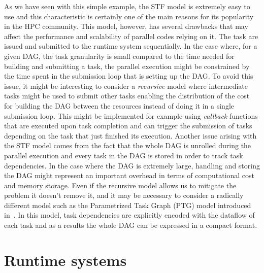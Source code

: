 \documentclass{article}
\begin{document}
As we have seen with this simple example, the STF model is extremely
easy to use and this characteristic is certainly one of the main
reasons for its popularity in the HPC community. This model, however,
has several drawbacks that may affect the performance and scalability
of parallel codes relying on it. The task are issued and submitted to
the runtime system sequentially. In the case where, for a given DAG,
the task granularity is small compared to the time needed for building
and submitting a task, the parallel execution might be constrained
by the time spent in the submission loop that is setting up the
DAG. To avoid this issue, it might be interesting to consider a
\textit{recursive} model where intermediate tasks might be used to
submit other tasks enabling the distribution of the cost for building
the DAG between the resources instead of doing it in a single
submission loop. This might be implemented for example using
\textit{callback} functions that are executed upon task completion and
can trigger the submission of tasks depending on the task that just
finished its execution. Another issue arising with the STF model comes
from the fact that the whole DAG is unrolled during the parallel
execution and every task in the DAG is stored in order to track task
dependencies. In the case where the DAG is extremely large, handling
and storing the DAG might represent an important overhead in terms of
computational cost and memory storage. Even if the recursive model
allows us to mitigate the problem it doesn't remove it, and it may be
necessary to consider a radically different model such as the
Parametrized Task Graph (PTG) model introduced in~\cite{c.l:95}. In
this model, task dependencies are explicitly encoded with the dataflow
of each task and as a results the whole DAG can be expressed in a
compact format.


\section{Runtime systems}\label{sec:runtime}
\setcounter{equation}{0}
\setcounter{table}{0}
\setcounter{figure}{0}
\end{document}
